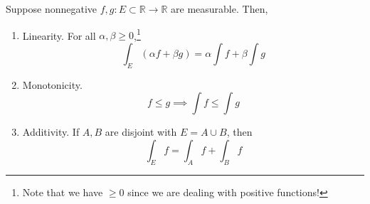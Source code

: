   \begin{theorem}
    Suppose nonnegative $f, g: E \subset \mathbb{R} \to \mathbb{R}$ are measurable. Then, 
    \begin{enumerate}
      \item Linearity. For all $\alpha, \beta \geq 0$,\footnote{Note that we have $\geq 0$ since we are dealing with positive functions!} 
        \begin{equation}
          \int_E (\alpha f + \beta g) = \alpha \int f + \beta \int g 
        \end{equation}

      \item Monotonicity. 
        \begin{equation}
          f \leq g \implies \int f \leq \int g 
        \end{equation}

      \item Additivity. If $A, B$ are disjoint with $E = A \cup B$, then 
        \begin{equation}
          \int_E f = \int_A f + \int_B f
        \end{equation}
    \end{enumerate}
  \end{theorem}
